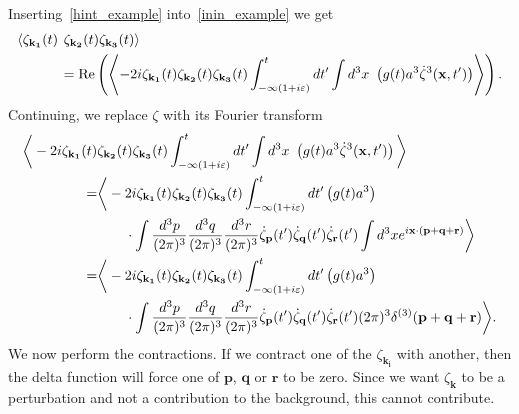 Inserting~\eqref{hint_example} into~\eqref{inin_example}
we get
\begin{align}\label{inin_example_start}
    \left<\zeta_{\mathbf{k_1}}(t)\right.&\left.\zeta_{\mathbf{k_2}}(t)\zeta_{\mathbf{k_3}}(t)\right>\\
    &=\operatorname{Re}\left(\left<-2i \zeta_{\mathbf{k_1}}(t)\zeta_{\mathbf{k_2}}(t)\zeta_{\mathbf{k_3}}(t)
    \int_{-\infty(1+i\varepsilon)}^{t}dt'
    \int d^3x~\left(g(t) a^3\dot{\zeta}^3(\mathbf{x},t')\right)
    \right>\right).
\end{align}
Continuing, we replace $\zeta$ with its Fourier transform
\begin{align}\label{inin_example_2}
    \bigg<-2i \zeta_{\mathbf{k_1}}(t)&\zeta_{\mathbf{k_2}}(t)\zeta_{\mathbf{k_3}}(t)
    \int_{-\infty(1+i\varepsilon)}^{t}dt'
    \int d^3x~\left(g(t) a^3\dot{\zeta}^3(\mathbf{x},t')\right)
    \bigg>\\
    =&\bigg<-2i \zeta_{\mathbf{k_1}}(t)\zeta_{\mathbf{k_2}}(t)\zeta_{\mathbf{k_3}}(t)
    \int_{-\infty(1+i\varepsilon)}^{t}dt'\left(g(t) a^3\right)\nonumber\\
    &\qquad\cdot
    \int \frac{d^3p}{(2\pi)^3}
    \frac{d^3q}{(2\pi)^3}
    \frac{d^3r}{(2\pi)^3}
    \dot{\zeta}_{\mathbf{p}}(t')
    \dot{\zeta}_{\mathbf{q}}(t')
    \dot{\zeta}_{\mathbf{r}}(t')
    \int d^3x e^{i\mathbf{x}\cdot(\mathbf{p}+\mathbf{q}+\mathbf{r})}
    \bigg>\\
    =&\bigg<-2i \zeta_{\mathbf{k_1}}(t)\zeta_{\mathbf{k_2}}(t)\zeta_{\mathbf{k_3}}(t)
    \int_{-\infty(1+i\varepsilon)}^{t}dt'\left(g(t) a^3\right)\nonumber\\
    &\qquad\cdot
    \int \frac{d^3p}{(2\pi)^3}
    \frac{d^3q}{(2\pi)^3}
    \frac{d^3r}{(2\pi)^3}
    \dot{\zeta}_{\mathbf{p}}(t')
    \dot{\zeta}_{\mathbf{q}}(t')
    \dot{\zeta}_{\mathbf{r}}(t')
    (2\pi)^3\delta^{(3)}(\mathbf{p}+\mathbf{q}+\mathbf{r})
    \bigg>.
\end{align}
We now perform the contractions. If we contract one of the $\zeta_{\mathbf{k_i}}$ with
another, then the delta function will force one of $\mathbf{p}$, $\mathbf{q}$
or $\mathbf{r}$ to be zero. Since we want $\zeta_\mathbf{k}$ to be a perturbation
and not a contribution to the background, this cannot contribute.


